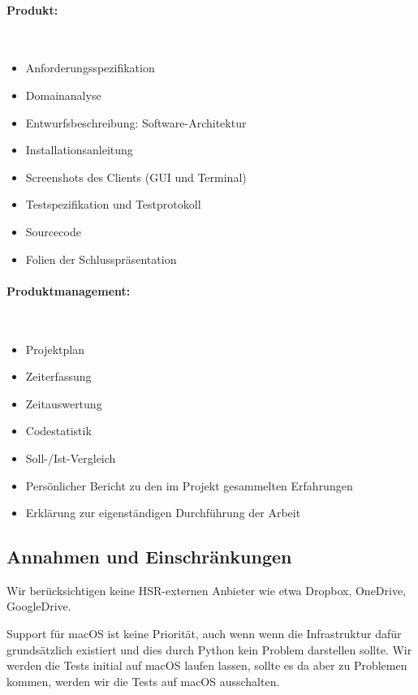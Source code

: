 \documentclass[a4paper]{article}
\begin{document}
\begin{multicols}{2}
  \paragraph{Produkt:} \strut \\[-1em]
  \begin{itemize}
    \item Anforderungsspezifikation
    \item Domainanalyse
    \item Entwurfsbeschreibung: Software-Architektur
    \item Installationsanleitung
    \item Screenshots des Clients (GUI und Terminal)
    \item Testspezifikation und Testprotokoll
    \item Sourcecode
    \item Folien der Schlusspräsentation
  \end{itemize}

  \paragraph{Produktmanagement:} \strut \\[-1em]
  \begin{itemize}
    \item Projektplan
    \item Zeiterfassung
    \item Zeitauswertung
    \item Codestatistik
    \item Soll-/Ist-Vergleich
    \item Persönlicher Bericht zu den im Projekt gesammelten Erfahrungen
    \item Erklärung zur eigenständigen Durchführung der Arbeit
  \end{itemize}
\end{multicols}

\subsection{Annahmen und Einschränkungen}
Wir berücksichtigen keine HSR-externen Anbieter wie etwa Dropbox, OneDrive, GoogleDrive.

Support für macOS ist keine Priorität, auch wenn wenn die Infrastruktur dafür
grundsätzlich existiert und dies durch Python kein Problem darstellen sollte.
Wir werden die Tests initial auf macOS laufen lassen, sollte es da aber zu
Problemen kommen, werden wir die Tests auf macOS ausschalten.
\end{document}
